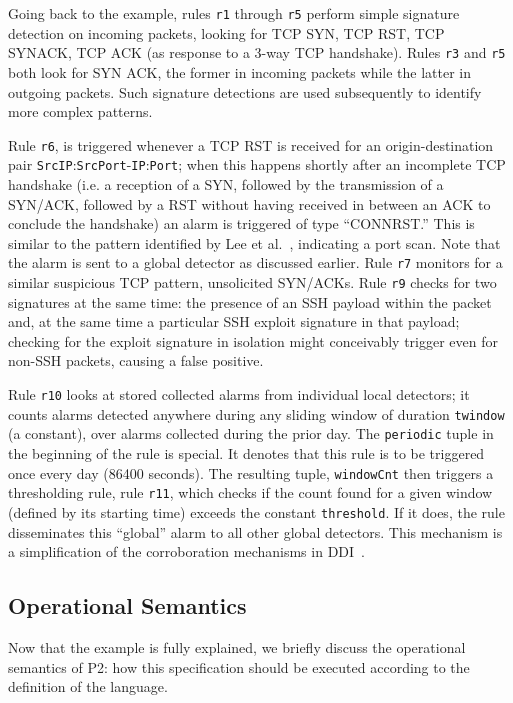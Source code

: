 \documentclass[10pt,twocolumn]{MyTightStyle}
\newcommand{\ol}[1]{{\tt\footnotesize#1}}
\begin{document}
Going back to the example, rules \ol{r1} through \ol{r5} perform simple
signature detection on incoming packets, looking for TCP SYN, TCP RST,
TCP SYNACK, TCP ACK (as response to a 3-way TCP handshake). Rules
\ol{r3} and \ol{r5} both look for SYN ACK, the former in incoming
packets while the latter in outgoing packets. Such signature detections
are used subsequently to identify more complex patterns.


Rule \ol{r6}, is triggered whenever a TCP RST is received for an
origin-destination pair \ol{SrcIP}:\ol{SrcPort}-\ol{IP}:\ol{Port}; when
this happens shortly after an incomplete TCP handshake (i.e. a reception
of a SYN, followed by the transmission of a SYN/ACK, followed by a RST
without having received in  between an ACK to conclude the
handshake) an alarm is triggered of type ``CONNRST.'' This is similar to
the pattern identified by Lee et al.~\cite{lee98}, indicating a port
scan. Note that the alarm is sent to a global detector as discussed earlier.
 Rule \ol{r7} monitors for a similar suspicious TCP pattern, unsolicited
 SYN/ACKs. Rule \ol{r9} checks for two signatures at the same time: the
 presence of an SSH payload within the packet and, at the same time a
 particular SSH exploit signature in that payload; checking for the
 exploit signature in isolation might conceivably trigger even for
 non-SSH packets, causing a false positive.

Rule \ol{r10} looks at stored collected alarms from individual local
detectors; it counts alarms detected anywhere during any sliding window
of duration \ol{twindow} (a constant), over alarms collected during the
prior day.  The \ol{periodic} tuple in the beginning of the rule is
special. It denotes that this rule is to be triggered once every day
(86400 seconds).   The resulting tuple, \ol{windowCnt} then triggers a
thresholding rule, rule \ol{r11}, which checks if the count found for a
given window (defined by its starting time) exceeds the constant
\ol{threshold}.  If it does, the rule disseminates this ``global'' alarm
to all other global detectors. This mechanism is a simplification of the
corroboration mechanisms in DDI~\cite{dash06}.




\subsection{Operational Semantics}

Now that the example is fully explained, we briefly discuss the
operational semantics of P2: how this specification should be executed
according to the definition of the language.
\end{document}
